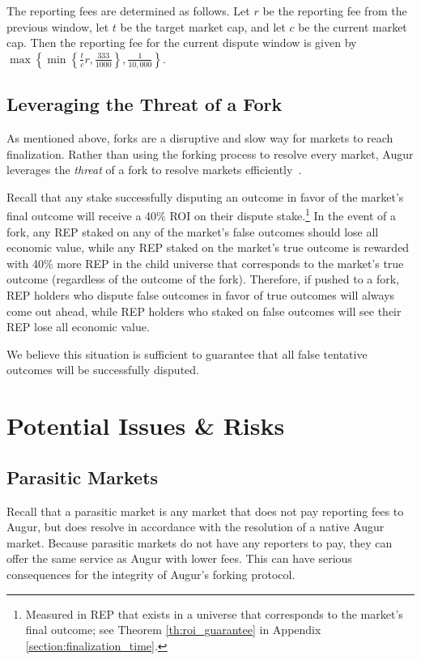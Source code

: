\documentclass[floatfix,reprint,nofootinbib,amsmath,amssymb,epsfig,pre,floats,letterpaper,groupedaffiliation]{revtex4-1}
\theoremstyle{definition}
\theoremstyle{definition}
\begin{document}
The reporting fees are determined as follows.  Let $r$ be the reporting fee from the previous window, let $t$ be the target market cap, and let $c$ be the current market cap.  Then the reporting fee for the current dispute window is given by $\max\left\{ \min\left\{\frac{t}{c}r, \frac{333}{1000}\right\} , \frac{1}{10,000}\right\}$.

\subsection{Leveraging the Threat of a Fork}\label{section:leveraging_the_threat_of_a_fork}

As mentioned above, forks are a disruptive and slow way for markets to reach finalization.  Rather than using the forking process to resolve every market, Augur leverages the \textit{threat} of a fork to resolve markets efficiently~\cite{Williams_2019}.

Recall that any stake successfully disputing an outcome in favor of the market's final outcome will receive a 40\% ROI on their dispute stake.\footnote{Measured in REP that exists in a universe that corresponds to the market's final outcome; see Theorem \ref{th:roi_guarantee} in Appendix \ref{section:finalization_time}.}  In the event of a fork, any REP staked on any of the market's false outcomes should lose all economic value, while any REP staked on the market's true outcome is rewarded with 40\% more REP in the child universe that corresponds to the market's true outcome (regardless of the outcome of the fork).  Therefore, if pushed to a fork, REP holders who dispute false outcomes in favor of true outcomes will always come out ahead, while REP holders who staked on false outcomes will see their REP lose all economic value.

We believe this situation is sufficient to guarantee that all false tentative outcomes will be successfully disputed.

\section{Potential Issues \& Risks}

\subsection{Parasitic Markets}

Recall that a parasitic market is any market that does not pay reporting fees to Augur, but does resolve in accordance with the resolution of a native Augur market. Because parasitic markets do not have any reporters to pay, they can offer the same service as Augur with lower fees. This can have serious consequences for the integrity of Augur's forking protocol.
\end{document}
